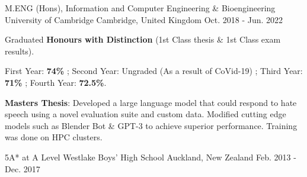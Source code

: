 

\begin{cventries}

  \cventry
    {M.ENG (Hons), Information and Computer Engineering \& Bioengineering} %
    {University of Cambridge} %
    {Cambridge, United Kingdom} %
    {Oct. 2018 - Jun. 2022} %
    {
      \begin{cvitems} %
        \item {Graduated \textbf{Honours with Distinction} (1st Class thesis \& 1st Class exam results).}
        \item {First Year: \textbf{74\%} ; Second Year: Ungraded (As a result of CoVid-19) ; Third Year: \textbf{71\%} ; Fourth Year: \textbf{72.5\%}.}
        \item {\textbf{Masters Thesis}: Developed a large language model that could respond to hate speech using a novel evaluation suite and custom data. Modified cutting edge models such as Blender Bot \& GPT-3 to achieve superior performance. Training was done on HPC clusters.}
      \end{cvitems}
    }

  \cventry
    {5A* at A Level} %
    {Westlake Boys' High School} %
    {Auckland, New Zealand} %
    {Feb. 2013 - Dec. 2017} %
    {}

\end{cventries}
